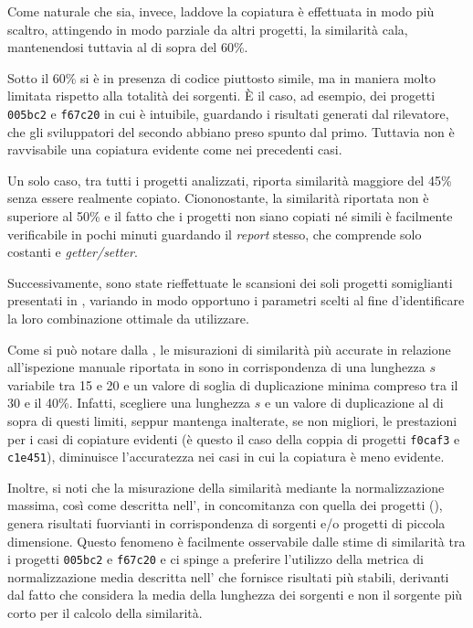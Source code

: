 Come naturale che sia, invece, laddove la copiatura è effettuata in modo più scaltro, attingendo in modo parziale da altri progetti, la similarità cala, mantenendosi tuttavia al di sopra del 60\%.

Sotto il 60\% si è in presenza di codice piuttosto simile, ma in maniera molto limitata rispetto alla totalità dei sorgenti.
%
\`E il caso, ad esempio, dei progetti \texttt{005bc2} e \texttt{f67c20} in cui è intuibile, guardando i risultati generati dal rilevatore, che gli sviluppatori del secondo abbiano preso spunto dal primo.
%
Tuttavia non è ravvisabile una copiatura evidente come nei precedenti casi.

Un solo caso, tra tutti i progetti analizzati, riporta similarità maggiore del 45\% senza essere realmente copiato.
%
Ciononostante, la similarità riportata non è superiore al 50\% e il fatto che i progetti non siano copiati né simili è facilmente verificabile in pochi minuti guardando il \textit{report} stesso, che comprende solo costanti e \textit{getter/setter}.

Successivamente, sono state rieffettuate le scansioni dei soli progetti somiglianti presentati in , variando in modo opportuno i parametri scelti al fine d'identificare la loro combinazione ottimale da utilizzare.

Come si può notare dalla , le misurazioni di similarità più accurate in relazione all'ispezione manuale riportata in  sono in corrispondenza di una lunghezza $s$ variabile tra 15 e 20 e un valore di soglia di duplicazione minima compreso tra il 30 e il 40\%.
%
Infatti, scegliere una lunghezza $s$ e un valore di duplicazione al di sopra di questi limiti, seppur mantenga inalterate, se non migliori, le prestazioni per i casi di copiature evidenti (è questo il caso della coppia di progetti \texttt{f0caf3} e \texttt{c1e451}), diminuisce l'accuratezza nei casi in cui la copiatura è meno evidente.

Inoltre, si noti che la misurazione della similarità mediante la normalizzazione massima, così come descritta nell', in concomitanza con quella dei progetti (), genera risultati fuorvianti in corrispondenza di sorgenti e/o progetti di piccola dimensione.
%
Questo fenomeno è facilmente osservabile dalle stime di similarità tra i progetti \texttt{005bc2} e \texttt{f67c20} e ci spinge a preferire l'utilizzo della metrica di normalizzazione media descritta nell' che fornisce risultati più stabili, derivanti dal fatto che considera la media della lunghezza dei sorgenti e non il sorgente più corto per il calcolo della similarità.

